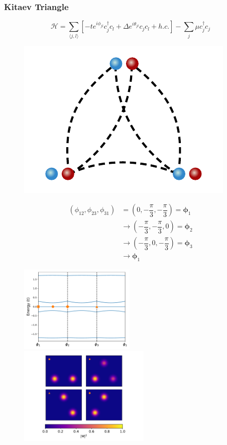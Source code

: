 \documentclass[xcolor=dvipsnames,10pt,aspectratio=169]{beamer}
\newcommand{\ham}{\mathcal{H}}
\newcommand{\cc}{c^{\dagger}}
\newcommand{\de}{\Delta}
\begin{document}
  \begin{frame}
    \frametitle{Kitaev Triangle}

    \begin{multicols}{2}
      \footnotesize
      \begin{equation*}
        \ham = \sum_{\langle j,l\rangle} \left[ -t e^{i\phi_{jl}}\cc_{j} c_l + \de e^{i\theta_{jl}} c_{j}c_l + h.c.\right] - \sum_j \mu \cc_j c_j
      \end{equation*}

      \vspace{-05mm}
      \begin{figure}
        \includegraphics[width=.3\textwidth]{./figures/3-point-triangle.pdf}
      \end{figure}

      \pause
      \vspace{-05mm}
      \footnotesize
      \begin{align*}
        (\phi_{12},\phi_{23},\phi_{31}) &= \left(0, -\dfrac{\pi}{3}, -\dfrac{\pi}{3}\right) = \bm\phi_1 \\
        &\rightarrow \left( -\dfrac{\pi}{3}, -\dfrac{\pi}{3}, 0 \right) = \bm\phi_2 \\
        &\rightarrow \left( -\dfrac{\pi}{3}, 0, -\dfrac{\pi}{3} \right) = \bm\phi_3 \\
        &\rightarrow \bm\phi_1
      \end{align*}

      \pause
      \begin{figure}
        \includegraphics[width=15em]{./figures/3eigval.pdf} \\
        \hspace{3mm}
        \includegraphics[width=17em]{./figures/3eigvec.pdf}
      \end{figure}

    \end{multicols}

  \end{frame}
\end{document}
